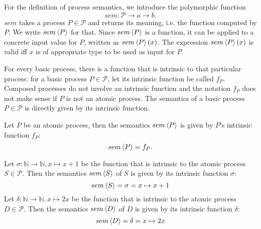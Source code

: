 For the definition of process semantics, we introduce the polymorphic function 
\begin{equation*}
  sem \colon \mathcal{P} \to a \to b.
\end{equation*}
$sem$ takes a process $P \in \mathcal{P}$ and returns its meaning, i.e. the function computed by $P$. We write $sem \left\langle P \right\rangle$ for that. Since $sem \left\langle P \right\rangle$ is a function, it can be applied to a concrete input value for $P$, written as $sem \left\langle P \right\rangle \left( x \right)$. The expression $sem \left\langle P \right\rangle \left( x \right)$ is valid iff $x$ is of appropriate type to be used as input for $P$.

For every basic process, there is a function that is intrinsic to that particular process: for a basic process $P \in \mathcal{P}$, let its intrinsic function be called $f_P$. Composed processes do not involve an intrinsic function and the notation $f_P$ does not make sense if $P$ is not an atomic process. The semantics of a basic process $P \in \mathcal{P}$ is directly given by its intrinsic function.
\begin{definition}
  \label{def:sem_atomic}
  Let $P$ be an atomic process, then the semantics $sem \left\langle P \right\rangle$ is given by $P$'s intrinsic function $f_P$:
  \begin{equation*}
    \label{eqn:sem_atomic}
    sem \left\langle P \right\rangle = f_P.
  \end{equation*}
  \vspace*{-0.5em}
  \hfill\qedsymbol
\end{definition}

\begin{example}
  \label{exp:sem_atomic}
  Let $\sigma \colon \mathbb{N} \to \mathbb{N}, x \mapsto x+1$ be the function that is intrinsic to the atomic process $S \in \mathcal{P}$. Then the semantics $sem \left\langle S \right\rangle$ of $S$ is given by its intrinsic function $\sigma$:
  \begin{equation*}
    sem \left\langle S \right\rangle = \sigma = x \mapsto x+1
  \end{equation*}
  Let $\delta \colon \mathbb{N} \to \mathbb{N}, x \mapsto 2x$ be the function that is intrinsic to the atomic process $D \in \mathcal{P}$. Then the semantics $sem \left\langle D \right\rangle$ of $D$ is given by its intrinsic function $\delta$:
  \begin{equation*}
    sem \left\langle D \right\rangle = \delta = x \mapsto 2x
  \end{equation*}
\end{example}

